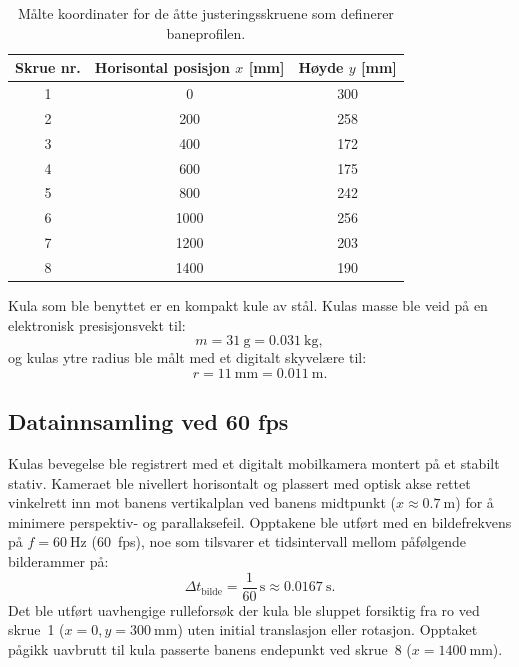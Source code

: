 \documentclass[11pt,a4paper]{article}
\begin{document}
\begin{table}[htbp]
    \centering
    \caption{Målte koordinater for de åtte justeringsskruene som definerer baneprofilen.}
    \label{tab:skruer}
    \begin{tabular}{@{}ccc@{}}
        \toprule
        \textbf{Skrue nr.} & \textbf{Horisontal posisjon $x$ [\si{\milli\meter}]} & \textbf{Høyde $y$ [\si{\milli\meter}]} \\ \midrule
        1 & 0    & 300 \\
        2 & 200  & 258 \\
        3 & 400  & 172 \\
        4 & 600  & 175 \\
        5 & 800  & 242 \\
        6 & 1000 & 256 \\
        7 & 1200 & 203 \\
        8 & 1400 & 190 \\ \bottomrule
    \end{tabular}
\end{table}

Kula som ble benyttet er en kompakt kule av stål. Kulas masse ble veid på en elektronisk presisjonsvekt til:
\begin{equation*}
    m = \SI{31}{\gram} = \SI{0,031}{\kilo\gram},
\end{equation*}
og kulas ytre radius ble målt med et digitalt skyvelære til:
\begin{equation*}
    r = \SI{11}{\milli\meter} = \SI{0,011}{\meter}.
\end{equation*}

\subsection{Datainnsamling ved 60 fps}
Kulas bevegelse ble registrert med et digitalt mobilkamera montert på et stabilt stativ. Kameraet ble nivellert horisontalt og plassert med optisk akse rettet vinkelrett inn mot banens vertikalplan ved banens midtpunkt ($x \approx \SI{0,7}{\meter}$) for å minimere perspektiv- og parallaksefeil. Opptakene ble utført med en bildefrekvens på $f = \SI{60}{\hertz}$ (\SI{60}{fps}), noe som tilsvarer et tidsintervall mellom påfølgende bilderammer på:
\begin{equation}
    \Delta t_{\text{bilde}} = \frac{1}{60}\,\si{\second} \approx \SI{0,0167}{\second}.
\end{equation}
Det ble utført uavhengige rulleforsøk der kula ble sluppet forsiktig fra ro ved skrue~1 ($x = 0, y = \SI{300}{\milli\meter}$) uten initial translasjon eller rotasjon. Opptaket pågikk uavbrutt til kula passerte banens endepunkt ved skrue~8 ($x = \SI{1400}{\milli\meter}$).
\end{document}
